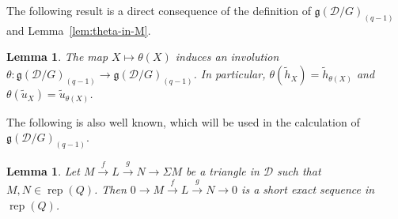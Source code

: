 \documentclass[12pt,reqno]{amsart}
\numberwithin{equation}{section}
\newcommand{\rep}{\operatorname{rep}\nolimits}
\newcommand{\Hom}{\operatorname{Hom}\nolimits}
\newtheorem{lemma}[theorem]{Lemma}
\begin{document}
	The following result is a direct consequence of the definition of $\mathfrak{g}(\mathcal{D}/G)_{(q-1)}$ and Lemma~\ref{lem:theta-in-M}.
	
	\begin{lemma}\label{lem:involution-Lie-algebra}
		The map $X\mapsto \theta(X)$ induces an involution  $\theta:\mathfrak{g}(\mathcal{D}/G)_{(q-1)}\rightarrow \mathfrak{g}(\mathcal{D}/G)_{(q-1)}$. In particular, $\theta(\tilde{h}_X)=\tilde{h}_{\theta(X)}$ and $\theta(\tilde{u}_X)=\tilde{u}_{\theta(X)}$.
	\end{lemma}
	
	The following is also well known, which will be used in the calculation of $\mathfrak{g}(\mathcal{D}/G)_{(q-1)}$. 
	\begin{lemma}\label{lem:s.e.s-induce-tri}
		Let $M\xrightarrow{f} L\xrightarrow{g} N\rightarrow \Sigma M$ be a triangle in $\mathcal{D}$ such that $M,N\in\rep(Q)$. Then $0\rightarrow M\xrightarrow{f} L\xrightarrow{g} N \rightarrow 0$ is a short exact sequence in $\rep(Q)$.
	\end{lemma}
	
	
	
	
\end{document}
